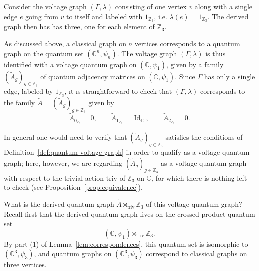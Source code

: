 \begin{example}
    \label{example:voltage-graph-z3}
    Consider the voltage graph \( (\Gamma, \lambda) \) consisting of one
    vertex \( v \) along with a single edge \( e \) going
    from \( v \) to itself and labeled with \( 1_{\mathbb{Z}_3} \),
    i.e. \( \lambda(e) = 1_{\mathbb{Z}_3} \). The derived graph then has
    has three, one for each element of \( \mathbb{Z}_3 \).

    

    As discussed above, a classical graph on \( n \) vertices
    corresponds to a quantum graph on the quantum set
    \( (\mathbb{C}^n, \psi_n) \). The voltage graph \( (\Gamma,\lambda) \)
    is thus identified with a voltage quantum graph on
    \( (\mathbb{C}, \psi_1) \), given by a family
    \( (\widetilde{A}_g)_{g \in \mathbb{Z}_3} \) of quantum adjacency
    matrices on \( (\mathbb{C}, \psi_1) \). Since \( \Gamma \) has only
    a single edge, labeled by \( 1_{\mathbb{Z}_3} \), it is
    straightforward to check that \( (\Gamma,\lambda) \) corresponds
    to the family \( \widetilde{A} = (\widetilde{A}_g)_{g \in \mathbb{Z}_3} \)
    given by
    \[
        \widetilde{A}_{0_{\mathbb{Z}_3}} = 0, \qquad
        \widetilde{A}_{1_{\mathbb{Z}_3}} =
        \operatorname{Id}_{\mathbb{C}}, \qquad
        \widetilde{A}_{2_{\mathbb{Z}_3}} = 0.
    \]

    In general one would need to verify that
    \( (\widetilde{A}_g)_{g \in \mathbb{Z}_3} \) satisfies the conditions
    of Definition~\ref{def:quantum-voltage-graph} in order to
    qualify as a voltage quantum graph; here, however, we are
    regarding \( (\widetilde{A}_g)_{g \in \mathbb{Z}_3} \) as a voltage
    quantum graph with respect to the trivial action \( \mathrm{triv} \)
    of \( \mathbb{Z}_3 \) on \( \mathbb{C} \), for which there is
    nothing left to check (see Proposition~\ref{prop:equivalence}).

    What is the derived quantum graph
    \( \widetilde{A} \rtimes_{\mathrm{triv}} \mathbb{Z}_3 \) of this
    voltage quantum graph? Recall first that the derived quantum
    graph lives on the crossed product quantum set
    \[
        (\mathbb{C}, \psi_1) \rtimes_{\mathrm{triv}} \mathbb{Z}_3.
    \]
    By part (1) of
    Lemma~\ref{lem:correspondences},
    this quantum set is isomorphic to \( (\mathbb{C}^3, \psi_3) \), and
    quantum graphs on \( (\mathbb{C}^3, \psi_3) \) correspond to
    classical graphs on three vertices.


\end{example}

